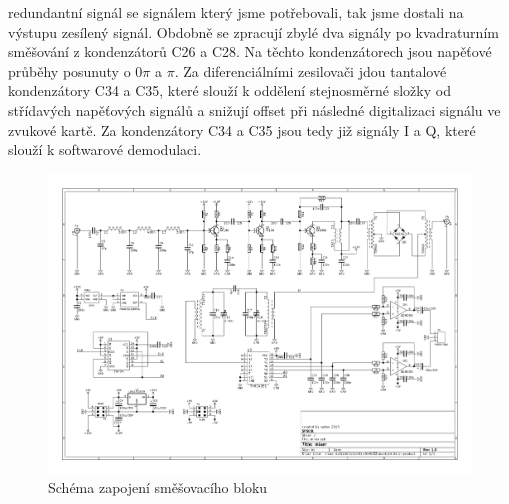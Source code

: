 redundantní signál se signálem který jsme potřebovali, tak jsme dostali na výstupu zesílený signál. Obdobně se zpracují zbylé dva signály po kvadraturním směšování z kondenzátorů C26 a C28. Na těchto kondenzátorech jsou napěťové průběhy posunuty o $0\pi$ a $\pi$. Za diferenciálními zesilovači jdou tantalové kondenzátory C34 a C35, které slouží k oddělení stejnosměrné složky od střídavých napěťových signálů a snižují  offset při následné digitalizaci signálu ve zvukové kartě. Za kondenzátory C34 a C35 jsou tedy již signály I a Q, které slouží k softwarové demodulaci.

\begin{landscape}
	\begin{figure}[h]
		\centering 	
		\includegraphics[height=\textwidth]{img/mix/sch.pdf}
		\caption{Schéma zapojení směšovacího bloku}	
	\end{figure}
\end{landscape}
%


